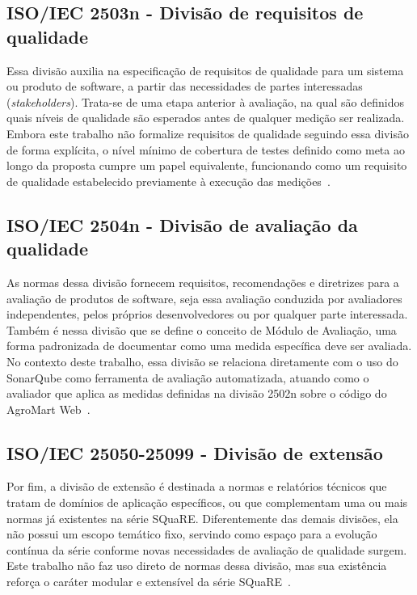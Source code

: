 \subsection{ISO/IEC 2503n - Divisão de requisitos de qualidade}

Essa divisão auxilia na especificação de requisitos de qualidade para um sistema ou produto de software, a partir das necessidades de partes interessadas (\textit{stakeholders}).
Trata-se de uma etapa anterior à avaliação, na qual são definidos quais níveis de qualidade são esperados antes de qualquer medição ser realizada.
Embora este trabalho não formalize requisitos de qualidade seguindo essa divisão de forma explícita, o nível mínimo de cobertura de testes definido como meta ao longo da proposta cumpre um papel equivalente, funcionando como um requisito de qualidade estabelecido previamente à execução das medições~\cite{iso25000guide}.

\subsection{ISO/IEC 2504n - Divisão de avaliação da qualidade}

As normas dessa divisão fornecem requisitos, recomendações e diretrizes para a avaliação de produtos de software, seja essa avaliação conduzida por avaliadores independentes, pelos próprios desenvolvedores ou por qualquer parte interessada.
Também é nessa divisão que se define o conceito de Módulo de Avaliação, uma forma padronizada de documentar como uma medida específica deve ser avaliada.
No contexto deste trabalho, essa divisão se relaciona diretamente com o uso do SonarQube como ferramenta de avaliação automatizada, atuando como o avaliador que aplica as medidas definidas na divisão 2502n sobre o código do AgroMart Web~\cite{iso25000guide}.

\subsection{ISO/IEC 25050-25099 - Divisão de extensão}

Por fim, a divisão de extensão é destinada a normas e relatórios técnicos que tratam de domínios de aplicação específicos, ou que complementam uma ou mais normas já existentes na série SQuaRE.
Diferentemente das demais divisões, ela não possui um escopo temático fixo, servindo como espaço para a evolução contínua da série conforme novas necessidades de avaliação de qualidade surgem.
Este trabalho não faz uso direto de normas dessa divisão, mas sua existência reforça o caráter modular e extensível da série SQuaRE~\cite{iso25000guide}.


